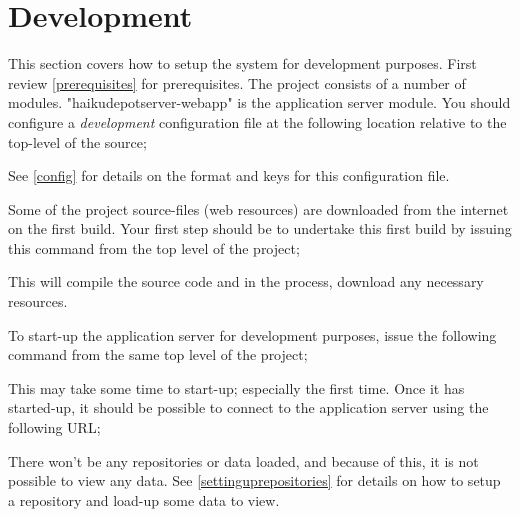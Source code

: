 
\section{Development}

This section covers how to setup the system for development purposes.  First review \ref{prerequisites} for prerequisites.  The project consists of a number of modules.  "haikudepotserver-webapp" is the application server module.  You should configure a {\it development} configuration file at the following location relative to the top-level of the source;


See \ref{config} for details on the format and keys for this configuration file.

Some of the project source-files (web resources) are downloaded from the internet on the first build.  Your first step should be to undertake this first build by issuing this command from the top level of the project;


This will compile the source code and in the process, download any necessary resources.

To start-up the application server for development purposes, issue the following command from the same top level of the project;


This may take some time to start-up; especially the first time.  Once it has started-up, it should be possible to connect to the application server using the following URL;


There won't be any repositories or data loaded, and because of this, it is not possible to view any data.  See \ref{settinguprepositories} for details on how to setup a repository and load-up some data to view.